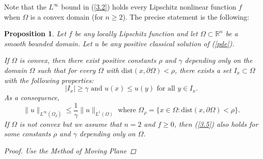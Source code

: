 \documentclass[paper=a4, fontsize=11pt]{scrartcl} %
\numberwithin{equation}{section} %
\numberwithin{figure}{section} %
\numberwithin{table}{section} %
\newtheorem{proposition}{Proposition}
\numberwithin{exercise}{section}
\begin{document}
Note that the $L^\infty$ bound in (\ref{3.2}) holds every Lipschitz nonlinear function $f$ when $\Omega$ is a convex domain (for $n\geq 2$). The precise statement is the following:
\begin{proposition}
Let $f$ be any locally Lipschitz function and let $\Omega\subset\mathbb{R}^n$ be a smooth bounded domain. Let $u$ be any positive classical solution of (\ref{pde}).

If $\Omega$ is convex, then there exist positive constants $\rho$ and $\gamma$ depending only on the domain $\Omega$ such that for every $\Omega$ with $\mathrm{dist}(x,\partial \Omega) <\rho$, there exists a set $I_x\subset \Omega$ with the following properties:
\begin{equation}\label{3.4}
|I_x|\geq \gamma \mbox{ and }  u(x) \leq u(y)  \mbox{ for all } y\in I_x.
\end{equation}
As a consequence, 
\begin{equation}\label{3.5}
\|u\|_{L^\infty(\Omega_{\rho})} \leq \frac{1}{\gamma} \|u\|_{L^1(\Omega)}  \mbox{ where } \Omega_{\rho}=\{x\in \Omega \colon \mathrm{dist}(x,\partial \Omega)<\rho \}.
\end{equation}
If $\Omega$ is not convex but we assume that $n=2$ and $f\geq 0$, then (\ref{3.5}) also holds for some constants $\rho$ and $\gamma$ depending only on $\Omega$.

\begin{proof}
Use the Method of Moving Plane
\end{proof}
\end{proposition}
\end{document}
